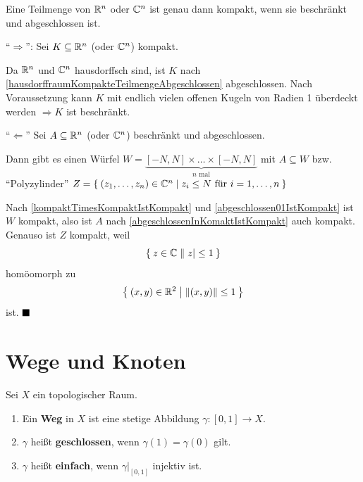\begin{satz}\label{satz:heine-borel}%
    Eine Teilmenge von $\mathbb{R}^n$ oder $\mathbb{C}^n$ ist genau dann kompakt,
    wenn sie beschränkt und abgeschlossen ist.
\end{satz}

\begin{beweis}
    \enquote{$\Rightarrow$}: Sei $K \subseteq \mathbb{R}^n$ (oder $\mathbb{C}^n$)
    kompakt.

    Da $\mathbb{R}^n$ und $\mathbb{C}^n$ hausdorffsch sind, ist $K$ nach
    \cref{hausdorffraumKompakteTeilmengeAbgeschlossen} abgeschlossen.
    Nach Voraussetzung kann $K$ mit endlich vielen offenen Kugeln von 
    Radien 1 überdeckt werden $\Rightarrow K$ ist beschränkt.

    \enquote{$\Leftarrow$} Sei $A \subseteq \mathbb{R}^n$ (oder $\mathbb{C}^n$)
    beschränkt und abgeschlossen.

    Dann gibt es einen Würfel $W = \underbrace{[-N, N] \times \dots \times [-N, N]}_{n \text{ mal}}$
    mit $A \subseteq W$ bzw. \enquote{Polyzylinder}
    $Z = \Set{(z_1, \dots, z_n) \in \ensuremath{\mathbb{C}}^n | z_i \leq N \text{ für } i= 1, \dots, n}$

    Nach \cref{kompaktTimesKompaktIstKompakt} und
    \cref{abgeschlossen01IstKompakt} ist $W$ kompakt, also ist $A$
    nach \cref{abgeschlossenInKomaktIstKompakt} auch kompakt.
    Genauso ist $Z$ kompakt, weil 
    \[\Set{z \in \ensuremath{\mathbb{C}}| |z| \leq 1}\]
    homöomorph zu
    \[\Set{(x,y) \in \ensuremath{\mathbb{R}}^2 | \|(x,y)\| \leq 1}\]
    ist. $\qed$
\end{beweis}

\section{Wege und Knoten}
\begin{definition}
    Sei $X$ ein topologischer Raum. 
    \begin{enumerate}[label=\alph*)]
        \item Ein \textbf{Weg} in $X$ ist eine stetige Abbildung $\gamma:[0,1] \rightarrow X$.
        \item $\gamma$ heißt \textbf{geschlossen}, wenn $\gamma(1) = \gamma(0)$ gilt.
        \item $\gamma$ heißt \textbf{einfach}, wenn $\gamma|_{[0,1]}$ 
              injektiv ist.
    \end{enumerate}
\end{definition}

